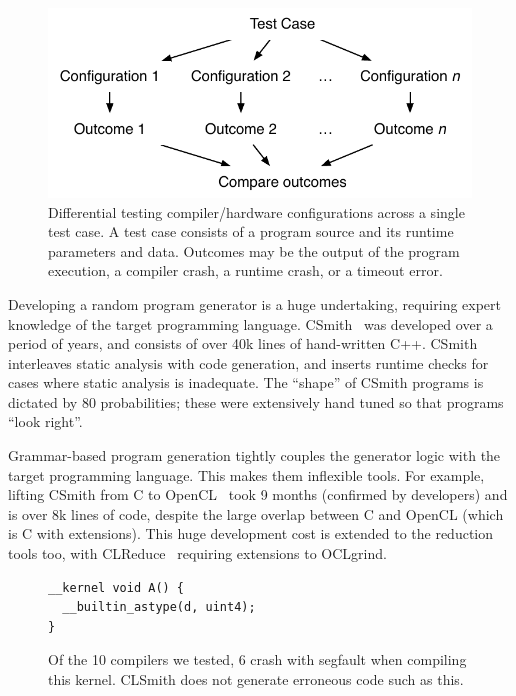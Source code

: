 \begin{figure}
	\centering
	\includegraphics[width=.85\columnwidth]{img/difftest} %
	\caption{%
		Differential testing compiler/hardware configurations across a single test case. A test case consists of a program source and its runtime parameters and data. Outcomes may be the output of the program execution, a compiler crash, a runtime crash, or a timeout error.%
	}%
	\label{fig:difftest}
\end{figure}

Developing a random program generator is a huge undertaking, requiring expert knowledge of the target programming language. CSmith~\cite{Yang2011} was developed over a period of years, and consists of over 40k lines of hand-written C++. CSmith interleaves static analysis with code generation, and inserts runtime checks for cases where static analysis is inadequate. The ``shape'' of CSmith programs is dictated by 80 probabilities; these were extensively hand tuned so that programs ``look right''.

Grammar-based program generation tightly couples the generator logic with the target programming language. This makes them inflexible tools. For example, lifting CSmith from C to OpenCL~\cite{Lidbury2015a} took 9 months (confirmed by developers) and is over 8k lines of code, despite the large overlap between C and OpenCL (which is C with extensions). This huge development cost is extended to the reduction tools too, with CLReduce~\cite{Pflanzer2016} requiring extensions to OCLgrind.


\begin{figure}
\lstset{language=[OpenCL]C}
\begin{lstlisting}
__kernel void A() {
  __builtin_astype(d, uint4);
}
\end{lstlisting}
  \caption{%
  	 Of the 10 compilers we tested, 6 crash with segfault when compiling this kernel.
  	 CLSmith does not generate erroneous code such as this.
  }%
  \label{fig:motivating-segfault}
\end{figure}


